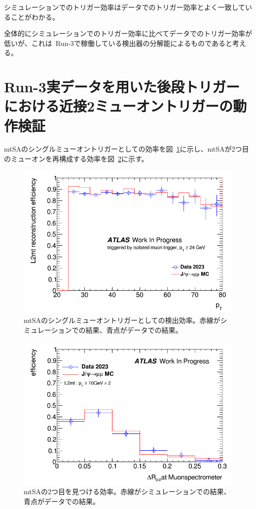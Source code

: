シミュレーションでのトリガー効率はデータでのトリガー効率とよく一致していることがわかる。

全体的にシミュレーションでのトリガー効率に比べてデータでのトリガー効率が低いが、これは~Run-3で稼働している検出器の分解能によるものであると考える。

\section{Run-3実データを用いた後段トリガーにおける近接2ミューオントリガーの動作検証}\label{chapter4-4}

mtSAのシングルミューオントリガーとしての効率を図~\ref{fig:L2mtSingleEff}に示し、mtSAが2つ目のミューオンを再構成する効率を図~\ref{fig:L2mt2muonEff}に示す。

\begin{figure}
    \centering
    \includegraphics[clip, width=12cm]{fig/4/L2mt_singlemuon_eff.png}
    \caption{mtSAのシングルミューオントリガーとしての検出効率。赤線がシミュレーションでの結果、青点がデータでの結果。}
    \label{fig:L2mtSingleEff}
\end{figure}

\begin{figure}
    \centering
    \includegraphics[clip, width=12cm]{fig/4/L2mt_eff_ext_deltaR.png}
    \caption{mtSAの2つ目を見つける効率。赤線がシミュレーションでの結果、青点がデータでの結果。}
    \label{fig:L2mt2muonEff}
\end{figure}

